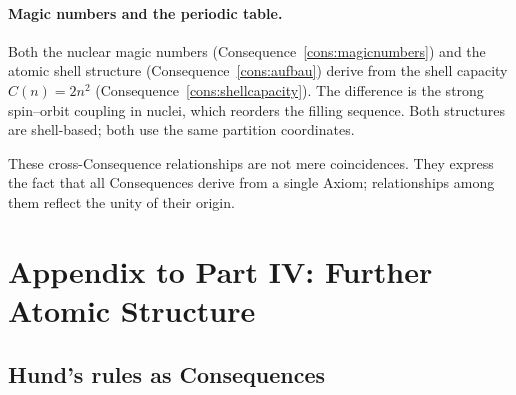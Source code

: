 \documentclass[11pt,twocolumn,a4paper]{article}
\theoremstyle{axiomstyle}
\theoremstyle{conseqstyle}
\theoremstyle{definition}
\theoremstyle{remark}
\begin{document}
\paragraph{Magic numbers and the periodic table.} Both the nuclear magic numbers (Consequence~\ref{cons:magicnumbers}) and the atomic shell structure (Consequence~\ref{cons:aufbau}) derive from the shell capacity $C(n)=2n^{2}$ (Consequence~\ref{cons:shellcapacity}). The difference is the strong spin--orbit coupling in nuclei, which reorders the filling sequence. Both structures are shell-based; both use the same partition coordinates.

These cross-Consequence relationships are not mere coincidences. They express the fact that all Consequences derive from a single Axiom; relationships among them reflect the unity of their origin.

\section*{Appendix to Part IV: Further Atomic Structure}

\subsection{Hund's rules as Consequences}
\end{document}
